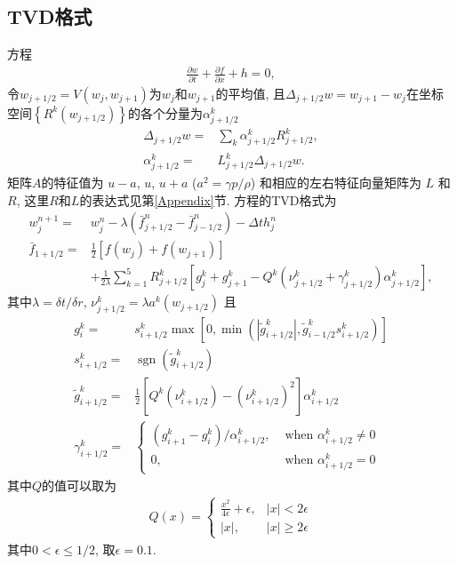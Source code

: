 \documentclass[10.5pt
]{article}
\begin{document}
\subsection{TVD格式}
方程
\begin{align}
\frac{\partial w}{\partial t}+\frac{\partial f}{\partial x}+h=0,
\end{align}
令$w_{j+1/2} = V(w_j, w_{j+1})$为$w_j$和$w_{j+1}$的平均值, 
且$\Delta_{j+1/2}w = w_{j+1} - w_j$在坐标空间$\left\{R^k \left(w_{j+1/2}\right)\right\}$的各个分量为$\alpha^{k} _{j+1/2}$
\begin{align}
\Delta_{j+1/2}w =& \sum_k \alpha^{k}_{j+1/2} R^{k}_{j+1/2},\\
\alpha^{k}_{j+1/2} =& L^{k}_{j+1/2} \Delta_{j+1/2}w.
\end{align}
矩阵$A$的特征值为 $u-a$, $u$, $u+a$ ($a^2 = \gamma p/\rho$) 和相应的左右特征向量矩阵为 $L$ 和 $R$, 这里$R$和$L$的表达式见第\ref{Appendix}节.
方程的TVD格式为\citep{Harten1983}
\begin{align}
w_{j}^{n+1}=&w_{j}^{n}-\lambda\left(\bar{f}_{j+1 / 2}^{n}-\bar{f}_{j-1 / 2}^{n}\right)-\Delta t h_{j}^{n}
\\
\bar{f}_{1+1 / 2}=&
\frac{1}{2}\left[f\left(w_{j}\right)+f\left(w_{j+1}\right)\right] \nonumber
\\ &+\frac{1}{2 \lambda} \sum_{k=1}^{5} R_{j+1 / 2}^{k}\left[g_{j}^{k}+g_{j+1}^{k}-Q^{k}\left(\nu_{j+1 / 2}^{k}+\gamma_{j+1 / 2}^{k}\right) \alpha_{j+1 / 2}^{k}\right],
\end{align}
其中$\lambda=\delta t/\delta r$, $\nu_{j+1 / 2}^{k}=\lambda a^k(w_{j+1/2})$ 且
\begin{align}
g_{i}^{k}=& s_{i+1 / 2}^{k} \max \left[0, \min \left(\left|\tilde{g}_{i+1 / 2}^{k}\right|, \tilde{g}_{i-1 / 2}^{k} s_{i+1 / 2}^{k}\right)\right] \\
s_{i+1 / 2}^{k}=&\operatorname{sgn}\left(\tilde{g}_{i+1 / 2}^{k}\right) \\ 
\tilde{g}_{i+1 / 2}^{k}=&\frac{1}{2}\left[Q^{k}\left(\nu_{i+1 / 2}^{k}\right)-\left(\nu_{i+1 / 2}^{k}\right)^{2}\right] \alpha_{i+1 / 2}^{k} \\ 
\gamma_{i+1 / 2}^{k}=&\left\{\begin{array}{ll}{\left(g_{i+1}^{k}-g_{i}^{k}\right) / \alpha_{i+1 / 2}^{k},} & {\text { when } \alpha_{i+1 / 2}^{k} \neq 0} \\ {0,} & {\text { when } \alpha_{i+1 / 2}^{k}=0}\end{array}\right.
\end{align}
其中$Q$的值可以取为
\begin{align}
Q(x)=\left\{\begin{array}{ll}{\frac{x^{2}}{4 \epsilon}+\epsilon,} & {|x|<2 \epsilon} \\ {|x|,} & {|x| \geq 2 \epsilon}\end{array}\right.
\end{align}
其中$0< \epsilon \leq 1/2$, 取$\epsilon=0.1$.
\end{document}
